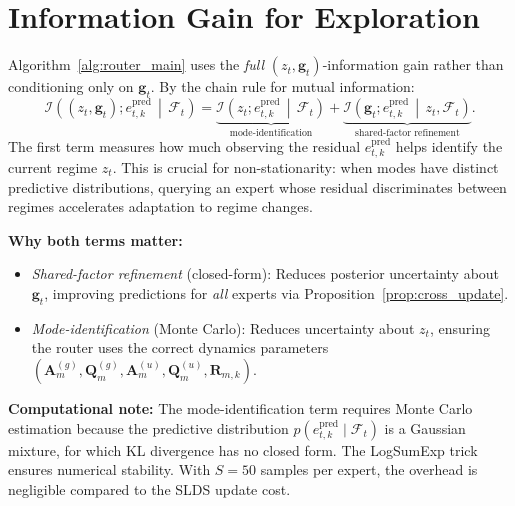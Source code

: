 \section{Information Gain for Exploration}
\label{app:info_gain}

\begin{remark}
\label{rmk:zg_information}
Algorithm~\ref{alg:router_main} uses the \emph{full} $(z_t,\mathbf{g}_t)$-information gain rather than
conditioning only on $\mathbf{g}_t$. By the chain rule for mutual information:
\begin{equation}
\label{eq:ig_chain_rule_rmk}
\mathcal{I}\!\left((z_t,\mathbf{g}_t);e_{t,k}^{\mathrm{pred}}\,\middle|\,\mathcal{F}_t\right)
=
\underbrace{\mathcal{I}\!\left(z_t;e_{t,k}^{\mathrm{pred}}\,\middle|\,\mathcal{F}_t\right)}_{\text{mode-identification}}
+
\underbrace{\mathcal{I}\!\left(\mathbf{g}_t;e_{t,k}^{\mathrm{pred}}\,\middle|\,z_t,\mathcal{F}_t\right)}_{\text{shared-factor refinement}}.
\end{equation}
The first term measures how much observing the residual $e_{t,k}^{\mathrm{pred}}$ helps identify the current
regime $z_t$. This is crucial for non-stationarity: when modes have distinct predictive distributions, querying
an expert whose residual discriminates between regimes accelerates adaptation to regime changes.
\end{remark}
\textbf{Why both terms matter:}
\begin{itemize}
\item \emph{Shared-factor refinement} (closed-form): Reduces posterior uncertainty about $\mathbf{g}_t$,
improving predictions for \emph{all} experts via Proposition~\ref{prop:cross_update}.
\item \emph{Mode-identification} (Monte Carlo): Reduces uncertainty about $z_t$, ensuring the router uses
the correct dynamics parameters $(\mathbf{A}_m^{(g)},\mathbf{Q}_m^{(g)},\mathbf{A}_m^{(u)},\mathbf{Q}_m^{(u)},\mathbf{R}_{m,k})$.
\end{itemize}

\textbf{Computational note:} The mode-identification term requires Monte Carlo estimation because the
predictive distribution $p(e_{t,k}^{\mathrm{pred}}\mid\mathcal{F}_t)$ is a Gaussian mixture, for which KL divergence has no
closed form. The LogSumExp trick ensures numerical stability. With $S=50$ samples per expert, the overhead is
negligible compared to the SLDS update cost.


